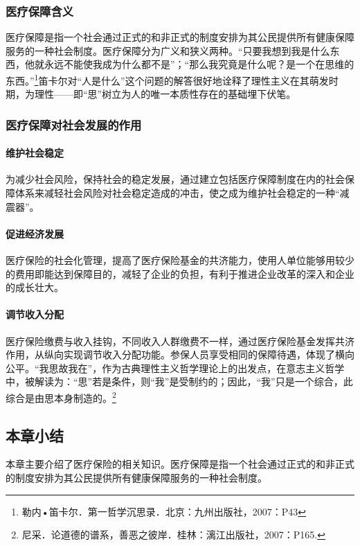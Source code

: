 \subsubsection{医疗保障含义}

医疗保障是指一个社会通过正式的和非正式的制度安排为其公民提供所有健康保障服务的一种社会制度。医疗保障分为广义和狭义两种。“只要我想到我是什么东西，他就永远不能使我成为什么都不是”；“那么我究竟是什么呢？是一个在思维的东西。”\footnote{勒内•笛卡尔．第一哲学沉思录．北京：九州出版社，2007：P43}笛卡尔对“人是什么”这个问题的解答很好地诠释了理性主义在其萌发时期，为理性——即“思”树立为人的唯一本质性存在的基础埋下伏笔。

\subsubsection{医疗保障对社会发展的作用}

\paragraph{维护社会稳定}

为减少社会风险，保持社会的稳定发展，通过建立包括医疗保障制度在内的社会保障体系来减轻社会风险对社会稳定造成的冲击，使之成为维护社会稳定的一种“减震器”。

\paragraph{促进经济发展}

医疗保险的社会化管理，提高了医疗保险基金的共济能力，使用人单位能够用较少的费用即能达到保障目的，减轻了企业的负担，有利于推进企业改革的深入和企业的成长壮大。

\paragraph{调节收入分配}

医疗保险缴费与收入挂钩，不同收入人群缴费不一样，通过医疗保险基金发挥共济作用，从纵向实现调节收入分配功能。参保人员享受相同的保障待遇，体现了横向公平。“我思故我在”，作为古典理性主义哲学理论上的出发点，在意志主义哲学中，被解读为：“思”若是条件，则“我”是受制约的；因此，“我”只是一个综合，此综合是由思本身制造的。\footnote{尼采．论道德的谱系，善恶之彼岸．桂林：漓江出版社，2007：P165.}

\subsection{本章小结}

本章主要介绍了医疗保险的相关知识。医疗保障是指一个社会通过正式的和非正式的制度安排为其公民提供所有健康保障服务的一种社会制度。
